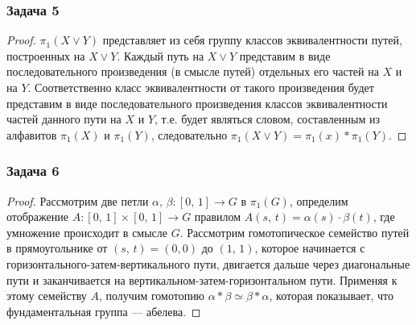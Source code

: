 \documentclass[a4paper]{article}
\newcommand{\prob}[1]{\subsubsection*{#1}}
\begin{document}
\prob{Задача 5}
\begin{proof}
	$\pi_1(X \vee Y)$ представляет из себя группу классов
	эквивалентности путей, построенных на  $X \vee Y$. Каждый
	путь на $X \vee Y$ представим в виде последовательного
	произведения (в смысле путей) отдельных его частей на
	$X$ и на $Y$. Соответственно класс эквивалентности от
	такого произведения будет представим в виде последовательного
	произведения классов эквивалентности частей данного пути
	на $X$ и $Y$, т.\:е. будет являться словом, составленным
	из алфавитов $\pi_1(X)$ и $\pi_1(Y)$, следовательно
	$\pi_1(X \vee Y)= \pi_1 (x) * \pi_1(Y)$.
\end{proof}
\prob{Задача 6}
\begin{proof}
	Рассмотрим две петли $\alpha,\,\beta :[0,\,1]\to G$ в
	$\pi_1(G)$, определим отображение $A: [0,\,1]\times
	[0,\,1]\to G$ правилом $A(s,\,t)=\alpha(s) \cdot \beta(t)$,
	где умножение происходит в смысле $G$. Рассмотрим
	гомотопическое семейство путей в прямоугольнике от $(s,\,t)
	=(0,0)$ до $(1,\,1)$, которое начинается с горизонтального-затем-вертикального пути, двигается дальше через диагональные пути и
	заканчивается на вертикальном-затем-горизонтальном пути.
	Применяя к этому семейству  $A$, получим гомотопию
	$\alpha * \beta \simeq \beta *\alpha $, которая показывает,
	что фундаментальная группа --- абелева.
\end{proof}
\end{document}
